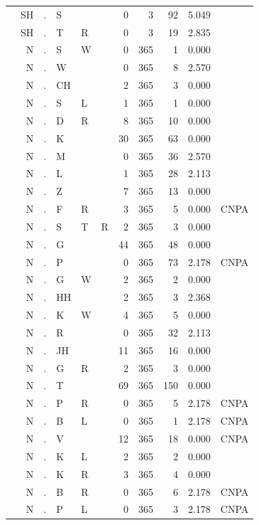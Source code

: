 \documentclass[12pt]{article}
\begin{document}
\begin{longtable}{r@{ } r@{ } c@{ } l@{ } l@{ } l@{ } r r r r l }
 & SH & . & S &  &  & 0 & 3 & 92 & 5.049 &  \\
 & SH & . & T & R &  & 0 & 3 & 19 & 2.835 &  \\
 & N & . & S & W &  & 0 & 365 & 1 & 0.000 &  \\
 & N & . & W &  &  & 0 & 365 & 8 & 2.570 &  \\
 & N & . & CH &  &  & 2 & 365 & 3 & 0.000 &  \\
 & N & . & S & L &  & 1 & 365 & 1 & 0.000 &  \\
 & N & . & D & R &  & 8 & 365 & 10 & 0.000 &  \\
 & N & . & K &  &  & 30 & 365 & 63 & 0.000 &  \\
 & N & . & M &  &  & 0 & 365 & 36 & 2.570 &  \\
 & N & . & L &  &  & 1 & 365 & 28 & 2.113 &  \\
 & N & . & Z &  &  & 7 & 365 & 13 & 0.000 &  \\
 & N & . & F & R &  & 3 & 365 & 5 & 0.000 & \textsc{CNPA} \\
 & N & . & S & T & R & 2 & 365 & 3 & 0.000 &  \\
 & N & . & G &  &  & 44 & 365 & 48 & 0.000 &  \\
 & N & . & P &  &  & 0 & 365 & 73 & 2.178 & \textsc{CNPA} \\
 & N & . & G & W &  & 2 & 365 & 2 & 0.000 &  \\
 & N & . & HH &  &  & 2 & 365 & 3 & 2.368 &  \\
 & N & . & K & W &  & 4 & 365 & 5 & 0.000 &  \\
 & N & . & R &  &  & 0 & 365 & 32 & 2.113 &  \\
 & N & . & JH &  &  & 11 & 365 & 16 & 0.000 &  \\
 & N & . & G & R &  & 2 & 365 & 3 & 0.000 &  \\
 & N & . & T &  &  & 69 & 365 & 150 & 0.000 &  \\
 & N & . & P & R &  & 0 & 365 & 5 & 2.178 & \textsc{CNPA} \\
 & N & . & B & L &  & 0 & 365 & 1 & 2.178 & \textsc{CNPA} \\
 & N & . & V &  &  & 12 & 365 & 18 & 0.000 & \textsc{CNPA} \\
 & N & . & K & L &  & 2 & 365 & 2 & 0.000 &  \\
 & N & . & K & R &  & 3 & 365 & 4 & 0.000 &  \\
 & N & . & B & R &  & 0 & 365 & 6 & 2.178 & \textsc{CNPA} \\
 & N & . & P & L &  & 0 & 365 & 3 & 2.178 & \textsc{CNPA} \\

\end{longtable}
\end{document}
